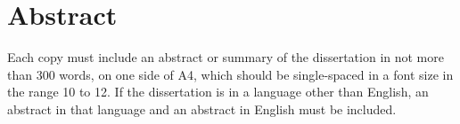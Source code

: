 \chapter*{Abstract}

Each copy must include an abstract or summary of the dissertation in not more than 300 words, on one side of A4, which should be single-spaced in a font size in the range 10 to 12. If the dissertation is in a language other than English, an abstract in that language and an abstract in English must be included.
